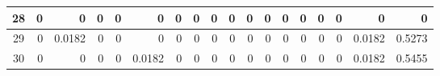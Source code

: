 \begin{table}[ht]
\begin{adjustbox}{width = \textwidth, center}
\begin{tabular}{|c|r|r|r|r|r|r|r|r|r|r|r|r|r|r|r|r|r|}
            \rowcolor[HTML]{FFFFFF} 
            \cellcolor[HTML]{CFE2F3}28                           & 0                                              & 0                                              & 0                                              & 0                                              & 0                                              & 0                                              & 0                                              & 0                                               & 0                                               & 0                                               & 0                                               & 0                                               & 0                                               & 0                                               & 0                                               & \cellcolor[HTML]{D9D2E9}0                                                             & \cellcolor[HTML]{D9D2E9}0                                                                 \\ \hline
            \rowcolor[HTML]{FFFFFF} 
            \cellcolor[HTML]{CFE2F3}29                           & 0                                              & \cellcolor[HTML]{C7E9D8}0.0182                 & 0                                              & 0                                              & 0                                              & 0                                              & 0                                              & 0                                               & 0                                               & 0                                               & 0                                               & 0                                               & 0                                               & 0                                               & 0                                               & \cellcolor[HTML]{D9D2E9}0.0182                                                        & \cellcolor[HTML]{D9D2E9}0.5273                                                            \\ \hline
            \rowcolor[HTML]{FFFFFF} 
            \cellcolor[HTML]{CFE2F3}30                           & 0                                              & 0                                              & 0                                              & 0                                              & \cellcolor[HTML]{C7E9D8}0.0182                 & 0                                              & 0                                              & 0                                               & 0                                               & 0                                               & 0                                               & 0                                               & 0                                               & 0                                               & 0                                               & \cellcolor[HTML]{D9D2E9}0.0182                                                        & \cellcolor[HTML]{D9D2E9}0.5455                                                            \\ \hline

\end{tabular}
\end{adjustbox}
\end{table}
